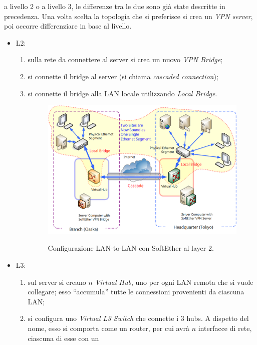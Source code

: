 \begin{itemize}
  a livello 2 o a livello 3, le differenze tra le due sono già state descritte
  in precedenza.
  Una volta scelta la topologia che si preferisce si crea un \textit{VPN server}, poi occorre
  differenziare in base al livello.
  \begin{itemize}
    \item L2:
    \begin{enumerate}
      \item sulla rete da connettere al server si crea un nuovo \textit{VPN Bridge};
      \item si connette il bridge al server (si chiama \textit{cascaded connection});
      \item si connette il bridge alla LAN locale utilizzando \textit{Local Bridge}.
      \begin{figure}
        \includegraphics[scale=0.55]{img/softether_l2_lan_to_lan}
        \label{fig:softether_l2_lan_to_lan}
        \caption[Configurazione LAN-to-LAN con SoftEther al layer 2]{Configurazione LAN-to-LAN con SoftEther al layer 2.}
      \end{figure}
    \end{enumerate}
    \item L3:
    \begin{enumerate}
      \item sul server si creano $n$ \textit{Virtual Hub}, uno per ogni LAN remota che si vuole
      collegare; esso ``accumula'' tutte le connessioni provenienti da ciascuna LAN;
      \item si configura uno \textit{Virtual L3 Switch} che connette i 3 hubs. A dispetto del nome,
      esso si comporta come un router, per cui avrà $n$ interfacce di rete, ciascuna di esse con un

\end{enumerate}
\end{itemize}
\end{itemize}
